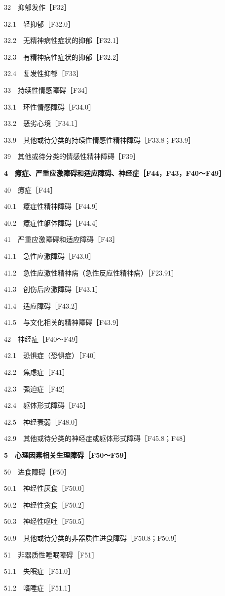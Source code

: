 32　抑郁发作［F32］

32.1　轻抑郁［F32.0］

32.2　无精神病性症状的抑郁［F32.1］

32.3　有精神病性症状的抑郁［F32.2］

32.4　复发性抑郁［F33］

33　持续性情感障碍［F34］

33.1　环性情感障碍［F34.0］

33.2　恶劣心境［F34.1］

33.9　其他或待分类的持续性情感性精神障碍［F33.8；F33.9］

39　其他或待分类的情感性精神障碍［F39］

\textbf{4　癔症、严重应激障碍和适应障碍、神经症［F44，F43，F40～F49］}

40　癔症［F44］

40.1　癔症性精神障碍［F44.9］

40.2　癔症性躯体障碍［F44.4］

41　严重应激障碍和适应障碍［F43］

41.1　急性应激障碍［F43.0］

41.2　急性应激性精神病（急性反应性精神病）［F23.91］

41.3　创伤后应激障碍［F43.1］

41.4　适应障碍［F43.2］

41.5　与文化相关的精神障碍［F43.9］

42　神经症［F40～F49］

42.1　恐惧症（恐惧症）［F40］

42.2　焦虑症［F41］

42.3　强迫症［F42］

42.4　躯体形式障碍［F45］

42.5　神经衰弱［F48.0］

42.9　其他或待分类的神经症或躯体形式障碍［F45.8；F48］

\textbf{5　心理因素相关生理障碍［F50～F59］}

50　进食障碍［F50］

50.1　神经性厌食［F50.0］

50.2　神经性贪食［F50.2］

50.3　神经性呕吐［F50.5］

50.9　其他或待分类的非器质性进食障碍［F50.8；F50.9］

51　非器质性睡眠障碍［F51］

51.1　失眠症［F51.0］

51.2　嗜睡症［F51.1］

